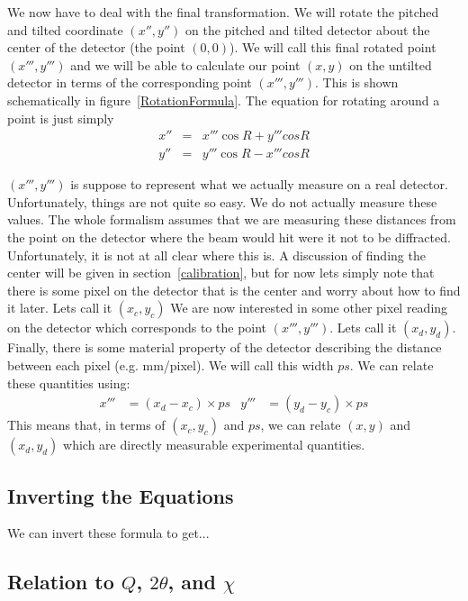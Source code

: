 We now have to deal with the final transformation. We will
rotate the pitched and tilted coordinate $(x'',y'')$ on the
pitched and tilted detector about the center of the
detector (the point $(0,0)$). We will call this final
rotated point $(x''',y''')$ and we will be able to calculate 
our point $(x,y)$ on the untilted detector in terms of the 
corresponding point $(x''',y''')$. This is shown schematically 
in figure~\ref{RotationFormula}. The equation for rotating 
around a point is just simply
\begin{eqnarray}\label{rotation}
    x''&=&x'''\cos R + y'''cos R\\
    y''&=&y'''\cos R - x'''cos R
\end{eqnarray}





$(x''',y''')$ is suppose to represent what we actually
measure on a real detector. Unfortunately, things are
not quite so easy. We do not actually measure these
values. The whole formalism assumes that we are 
measuring these distances from the point on the
detector where the beam would hit were it not to be
diffracted. Unfortunately, it is not at all clear
where this is. A discussion of finding the center will
be given in section~\ref{calibration}, but for now
lets simply note that there is some pixel on the detector
that is the center and worry about how to find it later. 
Lets call it $(x_c,y_c)$ 
We are now interested in some other pixel reading
on the detector which corresponds to the point
$(x''',y''')$. Lets call it $(x_d,y_d)$. Finally,
there is some material property of the detector 
describing the distance between each pixel
(e.g. \unit[1000]{mm/pixel}). We will call
this width $ps$. We can relate these quantities 
using:
\begin{align}\label{conversionToPixels}
    x'''&=(x_d-x_c) \times ps &
    y'''&=(y_d-y_c) \times ps
\end{align}
This means that, in terms of $(x_c,y_c)$ and $ps$,
we can relate $(x,y)$ and $(x_d,y_d)$ which are
directly measurable experimental quantities.



\subsection{Inverting the Equations}

We can invert these formula to get...

\subsection{Relation to $Q$, $2\theta$, and $\chi$}

